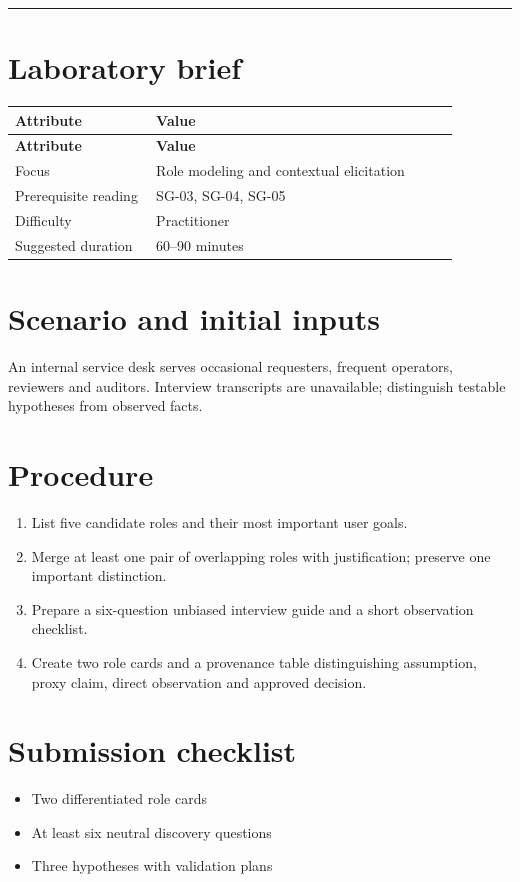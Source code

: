 \documentclass[11pt,letterpaper]{article}
\begin{document}
\tableofcontents\medskip\noindent\rule{\linewidth}{0.4pt}\medskip
\section{Laboratory brief}
\begin{longtable}{|p{0.28\linewidth}|p{0.60\linewidth}|}\hline
\textbf{Attribute} & \textbf{Value} \\ \hline\endfirsthead\hline
\textbf{Attribute} & \textbf{Value} \\ \hline\endhead
Focus & Role modeling and contextual elicitation \\ \hline
Prerequisite reading & SG-03, SG-04, SG-05 \\ \hline
Difficulty & Practitioner \\ \hline
Suggested duration & 60–90 minutes \\ \hline
\end{longtable}
\section{Scenario and initial inputs}
An internal service desk serves occasional requesters, frequent operators, reviewers and auditors. Interview transcripts are unavailable; distinguish testable hypotheses from observed facts.

\section{Procedure}
\begin{enumerate}[leftmargin=*,itemsep=3pt]
\item List five candidate roles and their most important user goals.
\item Merge at least one pair of overlapping roles with justification; preserve one important distinction.
\item Prepare a six-question unbiased interview guide and a short observation checklist.
\item Create two role cards and a provenance table distinguishing assumption, proxy claim, direct observation and approved decision.
\end{enumerate}
\section{Submission checklist}
\begin{itemize}[leftmargin=*,itemsep=2pt]
\item Two differentiated role cards
\item At least six neutral discovery questions
\item Three hypotheses with validation plans
\end{itemize}
\end{document}
